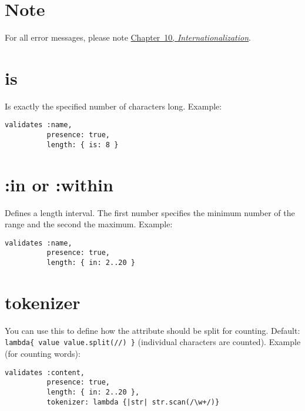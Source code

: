 \documentclass[a4paper]{book}
\def\w3cdtfymd{\the\year-\ifnum\month<10 0\fi\the\month-\ifnum\day<10 0\fi\the\day}
\begin{document}
\section{Note}\label{note-28}

For all error messages, please note \hyperref[i18n]{Chapter~10, \emph{Internationalization}}.

\section{is}\label{is}

Is exactly the specified number of characters long. Example:

\begin{shaded}\begin{verbatim}
validates :name,
          presence: true,
          length: { is: 8 }
\end{verbatim}\end{shaded}

\section{:in or :within}\label{in-or-within}

Defines a length interval. The first number specifies the minimum number of the range and the second the maximum. Example:

\begin{shaded}\begin{verbatim}
validates :name,
          presence: true,
          length: { in: 2..20 }
\end{verbatim}\end{shaded}

\section{tokenizer}\label{tokenizer}

You can use this to define how the attribute should be split for counting. Default: \texttt{lambda\{ \textbar{}value\textbar{} value.split(//) \}} (individual characters are counted). Example (for counting words):

\begin{shaded}\begin{verbatim}
validates :content,
          presence: true,
          length: { in: 2..20 },
          tokenizer: lambda {|str| str.scan(/\w+/)}
\end{verbatim}\end{shaded}
\end{document}
